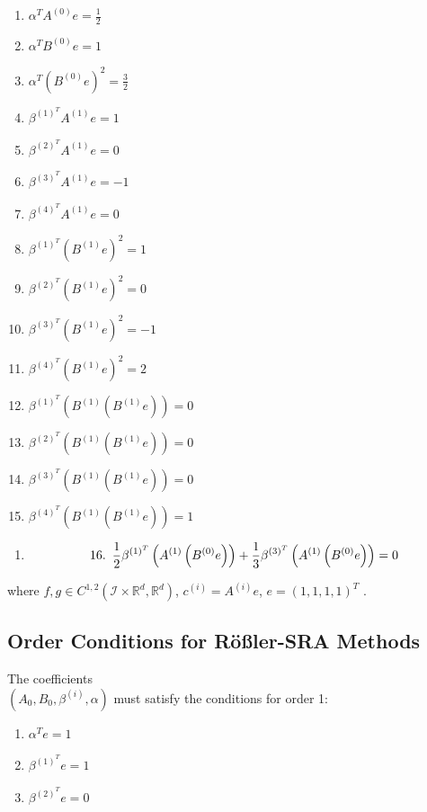 \documentclass{article}
\begin{document}
\begin{multicols}{2}
	\begin{enumerate}
		\item $\alpha^{T}A^{(0)}e=\frac{1}{2}$
		\item $\alpha^{T}B^{(0)}e=1$
		\item $\alpha^{T}\left(B^{(0)}e\right)^{2}=\frac{3}{2}$
		\item $\beta^{(1)^{T}}A^{(1)}e=1$
		\item $\beta^{(2)^{T}}A^{(1)}e=0$
		\item $\beta^{(3)^{T}}A^{(1)}e=-1$
		\item $\beta^{(4)^{T}}A^{(1)}e=0$
		\item $\beta^{(1)^{T}}\left(B^{(1)}e\right)^{2}=1$
		\item $\beta^{(2)^{T}}\left(B^{(1)}e\right)^{2}=0$
		\item $\beta^{(3)^{T}}\left(B^{(1)}e\right)^{2}=-1$
		\item $\beta^{(4)^{T}}\left(B^{(1)}e\right)^{2}=2$
		\item $\beta^{(1)^{T}}\left(B^{(1)}\left(B^{(1)}e\right)\right)=0$
		\item $\beta^{(2)^{T}}\left(B^{(1)}\left(B^{(1)}e\right)\right)=0$
		\item $\beta^{(3)^{T}}\left(B^{(1)}\left(B^{(1)}e\right)\right)=0$
		\item $\beta^{(4)^{T}}\left(B^{(1)}\left(B^{(1)}e\right)\right)=1$
	\end{enumerate}
\end{multicols}
\begin{enumerate}
	\item [ ]
	\[
	16.\thinspace\thinspace\thinspace\frac{1}{2}\beta^{(1)^{T}}\left(A^{(1)}\left(B^{(0)}e\right)\right)+\frac{1}{3}\beta^{(3)^{T}}\left(A^{(1)}\left(B^{(0)}e\right)\right)=0
	\]
\end{enumerate}
where $f,g\in C^{1,2}(\mathcal{I}\times\mathbb{R}^{d},\mathbb{R}^{d})$,
$c^{(i)}=A^{(i)}e$, $e=(1,1,1,1)^{T}$ \cite{RN2707}.

\subsection{Order Conditions for Rößler-SRA Methods\label{subsec:Order-Conditions-for-SRA}}

The coefficients\\
$\left(A_{0},B_{0},\beta^{(i)},\alpha\right)$ must satisfy the conditions
for order 1:

\begin{multicols}{3}
	\begin{enumerate}
		\item $\alpha^{T}e=1$
		\item $\beta^{(1)^{T}}e=1$
		\item $\beta^{(2)^{T}}e=0$
	\end{enumerate}
\end{multicols}
\end{document}
